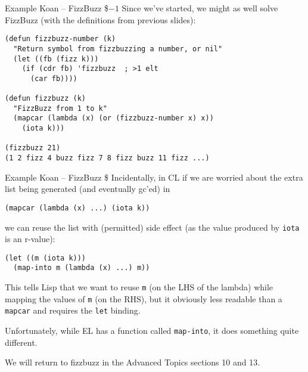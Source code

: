 \documentclass[presentation]{beamer}
\begin{document}
\begin{frame}[fragile]{Example Koan -- FizzBuzz \$$-1$}
  Since we've started, we might as well solve FizzBuzz (with the definitions from previous slides):
\begin{verbatim}
(defun fizzbuzz-number (k)
  "Return symbol from fizzbuzzing a number, or nil"
  (let ((fb (fizz k)))
    (if (cdr fb) 'fizzbuzz  ; >1 elt
      (car fb))))

(defun fizzbuzz (k)
  "FizzBuzz from 1 to k"
  (mapcar (lambda (x) (or (fizzbuzz-number x) x))
    (iota k)))

(fizzbuzz 21)
(1 2 fizz 4 buzz fizz 7 8 fizz buzz 11 fizz ...)
\end{verbatim}
\end{frame}
\begin{frame}[fragile]{Example Koan -- FizzBuzz \$}
Incidentally, in CL if we are worried about the extra list being generated (and eventually gc'ed) in
\begin{verbatim}
(mapcar (lambda (x) ...) (iota k))
\end{verbatim}
we can reuse the list with (permitted) side effect (as the value produced by \texttt{iota} is an r-value):
\begin{verbatim}
(let ((m (iota k)))
  (map-into m (lambda (x) ...) m))
\end{verbatim}
This tells Lisp that we want to reuse \texttt{m} (on the LHS of the lambda) while mapping the values of \texttt{m} (on the RHS), but it obviously less readable than a \texttt{mapcar} and requires the \texttt{let} binding.

\medskip
Unfortunately, while EL has a function called \texttt{map-into}, it does something quite different.

\medskip
We will return to fizzbuzz in the Advanced Topics sections 10 and 13.
\end{frame}
\end{document}
